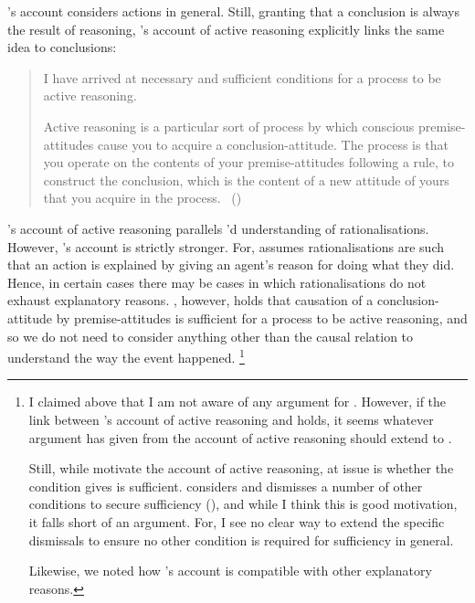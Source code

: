 \begin{note}
  \citeauthor{Davidson:1963aa}'s account considers actions in general.
  Still, granting that a conclusion is always the result of reasoning, \citeauthor{Broome:2013aa}'s account of active reasoning explicitly links the same idea to conclusions:
  \begin{quote}
    I have arrived at necessary and sufficient conditions for a process to be active reasoning.

    Active reasoning is a particular sort of process by which conscious premise-attitudes cause you to acquire a conclusion-attitude.
    The process is that you operate on the contents of your premise-attitudes following a rule, to construct the conclusion, which is the content of a new attitude of yours that you acquire in the process.%
    \mbox{ }\hfill\mbox{(\citeyear[234]{Broome:2013aa})}
  \end{quote}

  \citeauthor{Broome:2019aa}'s account of active reasoning parallels \citeauthor{Davidson:1963aa}'d understanding of rationalisations.
  However, \citeauthor{Broome:2019aa}'s account is strictly stronger.
  For, \citeauthor{Davidson:1963aa} assumes rationalisations are such that an action is explained by giving an agent's reason for doing what they did.
  Hence, in certain cases there may be cases in which rationalisations do not exhaust explanatory reasons.
  \citeauthor{Broome:2019aa}, however, holds that causation of a conclusion-attitude by premise-attitudes is sufficient for a process to be active reasoning, and so we do not need to consider anything other than the causal relation to understand the way the event happened.%
  \footnote{
    I claimed above that I am not aware of any argument for \issueInclusion{}.
    However, if the link between \citeauthor{Broome:2013aa}'s account of active reasoning and \issueInclusion{} holds, it seems whatever argument \citeauthor{Broome:2013aa} has given from the account of active reasoning should extend to \issueInclusion{}.

    Still, while \citeauthor{Broome:2013aa} motivate the account of active reasoning, at issue is whether the condition \citeauthor{Broome:2013aa} gives is sufficient.
    \citeauthor{Broome:2013aa} considers and dismisses a number of other conditions to secure sufficiency
    (\citeyear[cf.][\S13.2]{Broome:2013aa}), and while I think this is good motivation, it falls short of an argument.
    For, I see no clear way to extend the specific dismissals to ensure no other condition is required for sufficiency in general.

    Likewise, we noted how \citeauthor{Davidson:1963aa}'s account is compatible with other explanatory reasons.
  }
\end{note}

